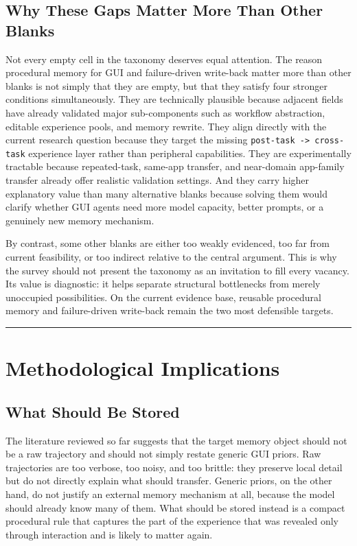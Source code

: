 \documentclass{article}
\begin{document}
\subsection{Why These Gaps Matter More Than Other
Blanks}\label{65-why-these-gaps-matter-more-than-other-blanks}

Not every empty cell in the taxonomy deserves equal attention. The
reason procedural memory for GUI and failure-driven write-back matter
more than other blanks is not simply that they are empty, but that they
satisfy four stronger conditions simultaneously. They are technically
plausible because adjacent fields have already validated major
sub-components such as workflow abstraction, editable experience pools,
and memory rewrite. They align directly with the current research
question because they target the missing
\texttt{post-task\ -\textgreater{}\ cross-task} experience layer rather
than peripheral capabilities. They are experimentally tractable because
repeated-task, same-app transfer, and near-domain app-family transfer
already offer realistic validation settings. And they carry higher
explanatory value than many alternative blanks because solving them
would clarify whether GUI agents need more model capacity, better
prompts, or a genuinely new memory mechanism.

By contrast, some other blanks are either too weakly evidenced, too far
from current feasibility, or too indirect relative to the central
argument. This is why the survey should not present the taxonomy as an
invitation to fill every vacancy. Its value is diagnostic: it helps
separate structural bottlenecks from merely unoccupied possibilities. On
the current evidence base, reusable procedural memory and failure-driven
write-back remain the two most defensible targets.

\begin{center}\rule{0.5\linewidth}{0.5pt}\end{center}

\section{Methodological
Implications}\label{7-methodological-implications}

\subsection{What Should Be Stored}\label{71-what-should-be-stored}

The literature reviewed so far suggests that the target memory object
should not be a raw trajectory and should not simply restate generic GUI
priors. Raw trajectories are too verbose, too noisy, and too brittle:
they preserve local detail but do not directly explain what should
transfer. Generic priors, on the other hand, do not justify an external
memory mechanism at all, because the model should already know many of
them. What should be stored instead is a compact procedural rule that
captures the part of the experience that was revealed only through
interaction and is likely to matter again.
\end{document}
